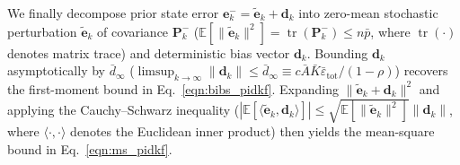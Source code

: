\documentclass[10pt,a4paper]{article}
\begin{document}
We finally decompose prior state error $\mathbf{e}_k^- = \tilde{\mathbf{e}}_k + \mathbf{d}_k$ into zero-mean stochastic perturbation $\tilde{\mathbf{e}}_k$ of covariance $\mathbf{P}_k^-$ ($\mathbb{E}[\|\tilde{\mathbf{e}}_k\|^2] = \operatorname{tr}(\mathbf{P}_k^-) \le n\bar{p}$, where $\operatorname{tr}(\cdot)$ denotes matrix trace) and deterministic bias vector $\mathbf{d}_k$. Bounding $\mathbf{d}_k$ asymptotically by $\bar{d}_\infty$ ($\limsup_{k\to\infty}\|\mathbf{d}_k\| \le \bar{d}_\infty \equiv c\bar{A}\bar{K}\bar{\varepsilon}_{\text{tot}}/(1-\rho)$) recovers the first-moment bound in Eq.~\eqref{eqn:bibs_pidkf}. Expanding $\|\tilde{\mathbf{e}}_k + \mathbf{d}_k\|^2$ and applying the Cauchy--Schwarz inequality ($|\mathbb{E}[\langle \tilde{\mathbf{e}}_k, \mathbf{d}_k \rangle]| \le \sqrt{\mathbb{E}[\|\tilde{\mathbf{e}}_k\|^2]}\|\mathbf{d}_k\|$, where $\langle \cdot, \cdot \rangle$ denotes the Euclidean inner product) then yields the mean-square bound in Eq.~\eqref{eqn:ms_pidkf}.

{\small{}
\let\oldbibitem\bibitem
\def\bibitem{\vspace{-5.2pt}\oldbibitem}


}
\end{document}

